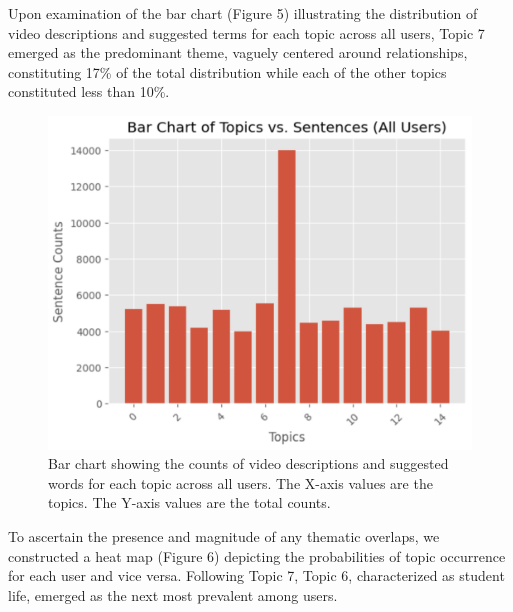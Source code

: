 \documentclass[acmtog]{acmart}
\begin{document}
Upon examination of the bar chart (Figure 5) illustrating the distribution of video descriptions and suggested terms for each topic across all users, Topic 7 emerged as the predominant theme, vaguely centered around relationships, constituting 17\% of the total distribution while each of the other topics constituted less than 10\%.

\begin{figure}[ht]
  \centering
  \includegraphics[width=\linewidth]{General Topic Distribution.png}
  \caption{Bar chart showing the counts of video descriptions and suggested words for each topic across all users. The X-axis values are the topics. The Y-axis values are the total counts. 
  \label{fig:topic counts}}
\end{figure}
To ascertain the presence and magnitude of any thematic overlaps, we constructed a heat map (Figure 6) depicting the probabilities of topic occurrence for each user and vice versa. Following Topic 7, Topic 6, characterized as student life, emerged as the next most prevalent among users.
\end{document}
